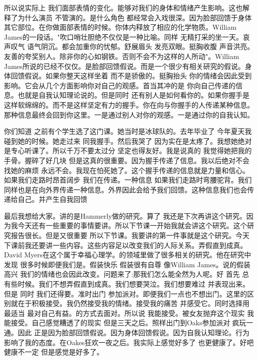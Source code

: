 所以说实际上 我们面部表情的变化。能够对我们的身体和情绪产生影响。这也解释了为什么演员 不管演的。是什么角色 都经常会入戏很深。因为脸部回馈于身体其它部位。在你做面部表情的时候。你体内释放了相应的化学物质。William James的一段话。"吹口哨壮胆绝不仅仅是一种比喻。同样 无精打采的坐一天。哀声叹气 语气阴沉。都会加重你的忧郁。舒展眉头 发亮双眼。挺胸收腹 声音洪亮。友善的夸奖别人。除非你的心如钢铁。否则不会不为这样的人所动"。William James所说的已经不仅仅。是脸部回馈假说。而是一个很少有相关研究的假说。身体回馈假说。如果你整天这样坐着 而不是骄傲的。挺胸抬头 你的情绪会因此受到影响。它会从几个方面影响你对自己的观感。首当其冲的是 你向自己传递的信息。也就是自我认知理论说的。但是同时 还有别人是如何看你的。如果你握手是这样软绵绵的。而不是这样坚定有力的握手。你在向与你握手的人传递某种信息。那种信息最终会回到你这里。一是通过别人对你的观感。一是通过你的自我认知。 

你们知道 之前有个学生选了这门课。她当时是冰球队的。去年毕业了 今年夏天我碰到她的时候。她走过来 同我握手。然后我哭了 因为实在是太疼了。我想她绝对是专心听课了。所以千万不要太过分 坚定也得友好。我是说真的 我觉得她把我的手骨。握碎了好几块 但是这真的很重要。因为握手传递了信息。我以后绝对不会找她的麻烦 永远不会。我现在怕死她了。这个握手传递的信息就是力量和信心。如果我们走路时昂首阔步 我们在传递。一种信息 如果我们走路时弯腰驼背。我们同样也是在向外界传递一种信息。外界因此会给予我们回馈。这种信息我们也会传递给自己。并产生自我回馈 

最后我想给大家。讲的是Hammerly做的研究。算了 我还是下次再讲这个研究。因为我今天还有一些重要的事情要讲。所以下节课一开始我就会讲这个研究。这个研究报告很长。但是又很重要 所以下节课。我要讲的第一件事就是这个研究。今天下课前我还要讲一些内容。这些内容足以改变我们的人际关系。弄假直到成真。David Myers在这个属于幸福心理学。的领域里做了很多相关的研究。他在研究中发现 很多时候即便我们是。假装快乐 假装很有自尊 像William James。说的假装高兴 我们的情绪也会因此改变。问题来了:那我们怎么能全然为人呢。好 首先 总有些时候。我们不想弄假直到成真。我们想要哭泣。我们想要难过 并表现出来。但是 同时 我们还得要。准时出门 参加派对。即便我们一点也不想出门。这里的区别就在于积极接受。我仍然接受我的情绪。接受我的痛苦 并感受它。同时选择用最适当 最对自己有益。的方式去面对。所以说 我能接受。被女友抛弃这个现实 我能接受。自己感觉糟透了的现实 但是三天之后。照样出门到Oaks参加派对 疯玩一通。因此 正是因为脸部回馈假说。因为身体回馈假说。因为自我认知理论。行为影响了我的态度。在Oakes狂欢一夜之后。我实际上感觉好多了 也更健康了。好吧健康不一定 但是感觉是好多了。 

